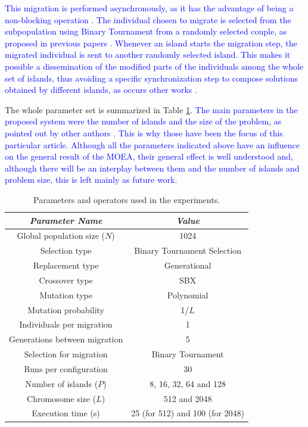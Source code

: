 \documentclass[preprint]{elsarticle}
\begin{document}
\textcolor{blue}{This migration
  is performed asynchronously, as it has the advantage of being a
  non-blocking operation \cite{TalbiUnified2018}. The individual
  chosen to migrate is selected from the subpopulation using Binary
  Tournament from a randomly selected couple, as proposed in previous papers
  \cite{xiong2003parallel,Xiao03specialized}. Whenever an island
  starts the migration step, the migrated individual is sent to
  another randomly selected island. This makes it possible a
  dissemination of the modified parts of the individuals among the
  whole set of islands, thus avoiding a specific synchronization step
  to compose solutions obtained by different islands, as occurs other
  works \cite{Dorronsoro13superlinear}.}

 The whole parameter set is summarized in Table \ref{tab:parameters}. 
 \textcolor{blue}{The main parameters in the proposed system were the number of islands and the size
   of the problem, as pointed out by other authors 
   \cite{CaoZLL17,Dorronsoro13superlinear,DorronsoroPSO2018,Martens13asynchronous,Durillo08masterslave}. This is why those have been the focus of this particular
   article. Although all the parameters indicated above have an
   influence on the general result of the MOEA, their general effect
   is well understood and, although there will be an interplay between
 them and the number of islands and problem size, this is left mainly
 as future work.} 






\begin{table}
\begin{center}
\begin{tabular}{|c|c|}
\hline
{\em Parameter Name} & {\em Value} \\ \hline
Global population size ($N$) & 1024 \\ \hline
Selection type & Binary Tournament Selection \\ \hline
Replacement type & Generational \\ \hline 
Crossover type & SBX \\ \hline
Mutation  type & Polynomial\\ \hline
Mutation probability & 1/$L$ \\ \hline
Individuals per migration & 1 \\ \hline
Generations between migration & 5 \\ \hline
Selection for migration & Binary Tournament\\ \hline
Runs per configuration & 30 \\ \hline \hline
Number of islands ($P$) & 8, 16, 32, 64 and 128 \\ \hline
Chromosome size ($L$) & 512 and 2048 \\ \hline
Execution time (s) & 25 (for 512) and 100 (for 2048) \\ \hline \hline
\end{tabular}
\caption{Parameters and operators used in the experiments.}
\label{tab:parameters}
\end{center}
\end{table}
\end{document}

